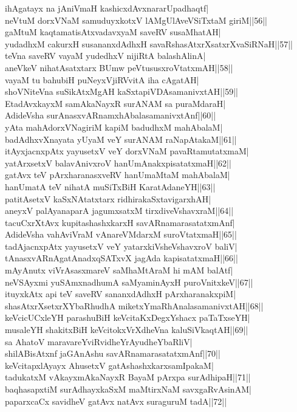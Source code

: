 \documentclass{article}
\begin{document}
ihAgatayx na jAniVmaH kashicxdAvxnararUpadhaqtf|\\
neVtuM dorxVNaM samuduyxkotxV lAMgUlAveVSiTxtaM giriM||56||\\
gaMtuM kaqtamatisAtxvadavxyaM saveRV susaMhatAH|\\
yudadhxM cakurxH susananxdAdhxH savaRshasAtxrXsatxrXvaSiRNaH||57||\\
teVna saveRV vayaM yudedhxV nijiRtA balashAlinA|\\
aneVkeV nihatAsatxtarx BUmw peVtususxroVtatxmAH||58||\\
vayaM tu bahubiH puNeyxVjiRVvitA iha cAgatAH|\\
shoVNiteVna suSikAtxMgAH kaSxtapiVDAsamanivxtAH||59||\\
EtadAvxkayxM samAkaNayxR surANAM sa puraMdaraH|\\
AdideVsha surAnasxvARnamxhAbalasamanivxtAnf||60||\\
yAta mahAdorxVNagiriM kapiM badudhxM mahAbalaM|\\
badAdhxvXnayata yUyaM veY surANAM raNapAtakaM||61||\\
itAyxjacnxpAtx yayusetxV veY dorxVNaM pavaRtamutatxmaM|\\
yatArxsetxV balavAnivxroV hanUmAnakxpisatatxmaH||62||\\
gatAvx teV pArxharanasxveRV hanUmaMtaM mahAbalaM|\\
hanUmatA teV nihatA muSiTxBiH KaratAdaneYH||63||\\
patitAsetxV kaSxNAtatxtarx ridhirakaSxtavigarxhAH|\\
aneyxV palAyanaparA jagumxsatxM tirxdiveVshavxraM||64||\\
tacuCxrXtAvx kupitashashxkarxH savARnamarasatatxmAnf|\\
AdideVsha vahAviVraM vAnareVMdarxM suroVtatxmaH||65||\\
tadAjacnxpAtx yayusetxV veY yatarxkiVsheVshavxroV baliV|\\
tAnasxvARnAgatAnadxqSATxvX jagAda kapisatatxmaH||66||\\
mAyAnutx viVrAsasxmareV saMhaMtAraM hi mAM balAtf|\\
neVSAyxmi yuSAmxnadhumA saMyaminAyxH puroVnitxkeV||67||\\
ituyxkAtx api teV saveRV sananxdAdhxH pArxharanakxpiM|\\
shasAtxrXsetxrXYbaRhudhA miketxYmaRhAnalasamanivxtAH||68||\\
keVcicUCxleYH parashuBiH keVcitaKxDegxYshacx paTaTxseYH|\\
musaleYH shakitxBiH keVcitokxVrXdheVna kaluSiVkaqtAH||69||\\
sa AhatoV maravareYviRvidheYrAyudheYbaRliV|\\
shilABisAtxnf jaGAnAshu savARnamarasatatxmAnf||70||\\
keVcitapxlAyayx AhusetxV gatAshashxkarxsamIpakaM|\\
tadukatxM vAkayxmAkaNayxR BayaM pArxpa surAdhipaH||71||\\
baqhasapxtiM surAdhayxkaSxM maMtirxNaM savxgaRvAsinAM|\\
paparxcaCx savidheV gatAvx natAvx suraguruM tadA||72||\\
\end{document}
